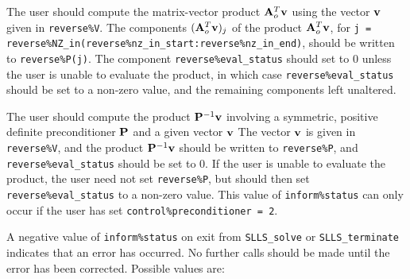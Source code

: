\documentclass{galahad}
\newcommand{\packagename}{SLLS}
\begin{document}
\begin{description}
 The user should compute the matrix-vector product ${\mathbf{A}}_o^T {\mathbf{v}}$
     using the vector ${\mathbf{v}}$ given in {\tt reverse\%V}. The components
     $({\mathbf{A}}_o^T {\mathbf{v}})_j$ of the product ${\mathbf{A}}_o^T {\mathbf{v}}$, for
     {\tt j = reverse\%NZ\_in(reverse\%nz\_in\_start:reverse\%nz\_in\_end)},
     should be written to {\tt reverse\%P(j)}.
     The component {\tt reverse\%eval\_status} should set to 0 unless the
     user is unable to evaluate the product, in which case
     {\tt reverse\%eval\_status} should be set to a non-zero value, and the
      remaining components left unaltered.

 The user should compute the product ${\mathbf{P}}^{-1} {\mathbf{v}}$
     involving a symmetric, positive definite preconditioner ${\mathbf{P}}$ 
     and a given vector ${\mathbf{v}}$
     The vector ${\mathbf{v}}$ is given in {\tt reverse\%V}, and the
     product ${\mathbf{P}}^{-1} {\mathbf{v}}$ should be written to {\tt reverse\%P},
     and  {\tt reverse\%eval\_status} should be set to 0.
     If the user is unable to evaluate the product,
     the user need not set {\tt reverse\%P}, but
     should then set {\tt reverse\%eval\_status} to a non-zero value.
     This value of {\tt inform\%status} can only occur if the user 
     has set {\tt control\%preconditioner = 2}.

\end{description}




\galerrors
A negative value of {\tt inform\%status} on exit from
{\tt \packagename\_solve}
or
{\tt \packagename\_terminate}
indicates that an error has occurred. No further calls should be made
until the error has been corrected. Possible values are:
\end{document}
